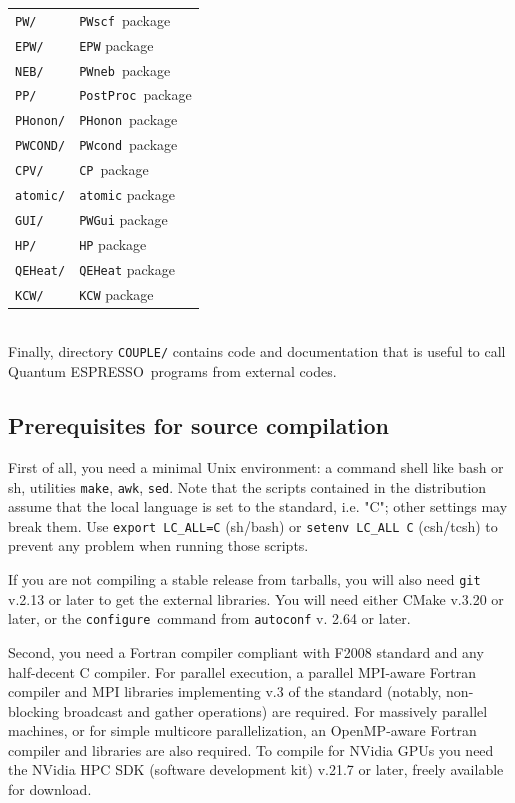 \documentclass[12pt,a4paper]{article}
\def\qe{{\sc Quantum ESPRESSO}}
\def\configure{\texttt{configure}}
\def\PWscf{\texttt{PWscf}}
\def\PHonon{\texttt{PHonon}}
\def\CP{\texttt{CP}}
\def\PostProc{\texttt{PostProc}}
\def\NEB{\texttt{PWneb}}
\def\make{\texttt{make}}
\begin{document}
\begin{tabular}{ll}
\texttt{PW/}      & \PWscf\ package\\
\texttt{EPW/}     & \texttt{EPW} package\\
\texttt{NEB/}     & \NEB\ package\\
\texttt{PP/}      & \PostProc\ package\\
\texttt{PHonon/}  & \PHonon\ package\\
\texttt{PWCOND/}  & \texttt{PWcond}\ package\\
\texttt{CPV/}     & \CP\ package\\
\texttt{atomic/}  & \texttt{atomic} package\\
\texttt{GUI/}     & \texttt{PWGui} package\\
\texttt{HP/}      & \texttt{HP} package\\
\texttt{QEHeat/}  & \texttt{QEHeat} package\\
\texttt{KCW/}     & \texttt{KCW} package
\end{tabular}
\\

Finally, directory \texttt{COUPLE/} contains code and documentation
that is useful to call \qe\ programs from external codes.

\subsection{Prerequisites for source compilation}
\label{Sec:Installation}

First of all, you need a minimal Unix environment: a command shell 
like bash or sh, utilities \make, \texttt{awk}, \texttt{sed}. 
Note that the scripts contained in the distribution 
assume that the local  language is set to the standard, i.e. "C"; 
other settings may break them. Use \texttt{export LC\_ALL=C} (sh/bash) 
or \texttt{setenv LC\_ALL C} (csh/tcsh) to prevent any problem
when running those scripts.

If you are not compiling a stable release from tarballs,
you will also need \texttt{git} v.2.13 or later to get the 
external libraries.
You will need either CMake v.3.20 or later, or the \configure\ 
command from \texttt{autoconf} v. 2.64 or later.

Second, you need a Fortran compiler compliant with F2008 standard
and any half-decent C compiler.
For parallel execution, a parallel MPI-aware Fortran compiler 
and MPI libraries implementing v.3 of the standard (notably, 
non-blocking broadcast and gather operations) are required.
For massively parallel machines, or for simple multicore parallelization, 
an OpenMP-aware Fortran compiler and libraries are also required. 
To compile 
for NVidia GPUs you need the NVidia HPC SDK (software development kit) 
v.21.7 or later, freely available for download.
\end{document}
